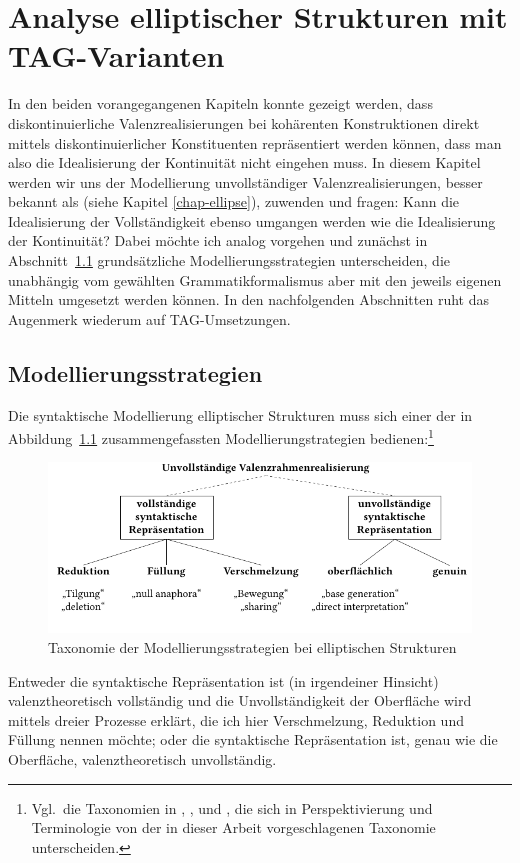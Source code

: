 \chapter{Analyse elliptischer Strukturen mit TAG-Varianten} \label{sec-ellipsenanalyse}


In den beiden vorangegangenen Kapiteln konnte gezeigt werden, dass diskontinuierliche Valenzrealisierungen bei kohärenten Konstruktionen direkt mittels diskontinuierlicher Konstituenten repräsentiert werden können, dass man also die Idealisierung der Kontinuität nicht eingehen muss. In diesem Kapitel werden wir uns der Modellierung unvollständiger Valenzrealisierungen, besser bekannt als  (siehe Kapitel \ref{chap-ellipse}), zuwenden und fragen: Kann die Idealisierung der Vollständigkeit ebenso umgangen werden wie die Idealisierung der Kontinuität? Dabei möchte ich analog vorgehen und zunächst in Abschnitt~\ref{sec-ellipsenanalyse-wege} grundsätzliche Modellierungsstrategien unterscheiden, die unabhängig vom gewählten Grammatikformalismus aber mit den jeweils eigenen Mitteln umgesetzt werden können. In den nachfolgenden Abschnitten ruht das Augenmerk wiederum auf TAG-Umsetzungen. 



\section{Modellierungsstrategien} \label{sec-ellipsenanalyse-wege}

Die syntaktische Modellierung elliptischer Strukturen muss sich einer der in Abbildung~\ref{fig-ellipse-strategien} zusammengefassten Modellierungstrategien bedienen:\footnote{Vgl.\ die Taxonomien in \citet[768f,788f]{Klein:93}, \citet[16ff]{Schwabe:94}, \citet[5]{Winkler:Schwabe:03} und \citet[2]{Aelbrecht:10}, die sich in Perspektivierung und Terminologie von der in dieser Arbeit vorgeschlagenen Taxonomie unterscheiden.}
\begin{figure}[t]
\centering
\includegraphics{graphics/abb81.pdf}
\caption{\label{fig-ellipse-strategien}Taxonomie der Modellierungsstrategien bei elliptischen Strukturen}
\end{figure}
Entweder die syntaktische Repräsentation ist (in irgendeiner Hinsicht) valenztheoretisch vollständig und die Unvollständigkeit der Oberfläche wird mittels dreier Prozesse erklärt, die ich hier Verschmelzung, Reduktion und Füllung nennen möchte; oder die syntaktische Repräsentation ist, genau wie die Oberfläche, valenztheoretisch unvollständig.

